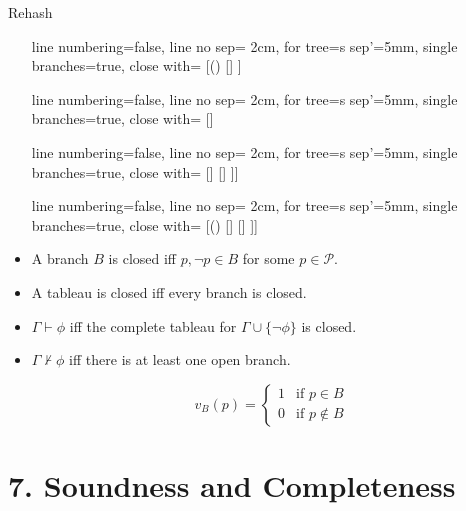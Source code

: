 \documentclass[../slides.tex]{subfiles}
\begin{document}
\begin{frame}{Rehash}
\begin{itemize}
{\begin{center}
					\vspace{2ex}

					\begin{prooftree}
					{
					line numbering=false,
					line no sep= 2cm,
					for tree={s sep'=5mm},
					single branches=true,
					close with=\xmark
					}
					[\neg (\phi\to\psi) [\phi [\neg \psi ] ] ]
					\end{prooftree}
					\begin{prooftree}
					{
					line numbering=false,
					line no sep= 2cm,
					for tree={s sep'=5mm},
					single branches=true,
					close with=\xmark
					}
					[\phi\to\psi [\neg \phi ] [\psi ] ]
					\end{prooftree}
					\begin{prooftree}
					{
					line numbering=false,
					line no sep= 2cm,
					for tree={s sep'=5mm},
					single branches=true,
					close with=\xmark
					}
					[\phi\leftrightarrow \psi [\phi [\psi] ] [\neg \phi [\neg \psi] ] ]]
					\end{prooftree}
					\begin{prooftree}
					{
					line numbering=false,
					line no sep= 2cm,
					for tree={s sep'=5mm},
					single branches=true,
					close with=\xmark
					}
					[\neg(\phi\leftrightarrow \psi) [\phi [\neg \psi] ] [\neg \phi [ \psi] ] ]]
					\end{prooftree}

				\end{center}}
				
	\item A branch $B$ is closed iff $p,\neg p\in B$ for some $p\in\mathcal{P}$.
	
	\item A tableau is closed iff every branch is closed.
	
	\item $\Gamma\vdash \phi$ iff the complete tableau for $\Gamma\cup\{\neg\phi\}$ is closed.
	
	\item $\Gamma\nvdash\phi$  iff there is at least one open branch.
	
\[v_B(p)=\begin{cases} 1 &\text{if }p\in B\\0&\text{if }p\notin B\end{cases}\]
\end{itemize}


\end{frame}
		

\section{7. Soundness and Completeness}
\end{document}
